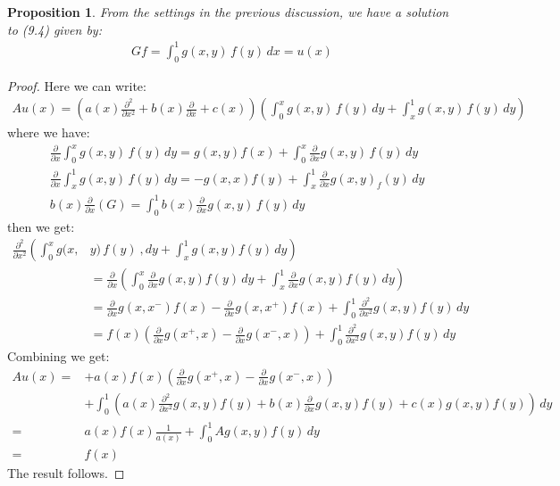 \documentclass[11pt]{book}
\theoremstyle{break}
\theoremstyle{break}
\newtheorem{prop}[lem]{Proposition}
\newcommand{\pd}{\partial}
\begin{document}
\begin{prop}
From the settings in the previous discussion, we have a solution to (9.4) given by:
\begin{align*}
Gf = \int_0^1 g(x,y) \, f(y) \, dx = u(x)
\end{align*}
\end{prop}
\begin{proof}
Here we can write:
\begin{align*}
Au(x) = \left(a(x)\frac{\pd^2}{\pd x^2} + b(x) \frac{\pd}{\pd x} + c(x) \right) \left(\int_0^x g(x,y) \, f(y) \, dy + \int_x^1 g(x,y) \, f(y) \, dy\right)
\end{align*}
where we have:
\begin{align*}
&\frac{\pd}{\pd x} \int_0^x g(x,y) \, f(y) \, dy = g(x,y) f(x) + \int_0^x \frac{\pd}{\pd x}g(x,y) \, f(y) \, dy\\
&\frac{\pd}{\pd x} \int_x^1 g(x,y)\, f(y) \, dy = -g(x,x) f(y) + \int_x^1 \frac{\pd}{\pd x}g(x,y) _f(y) \, dy\\
&b(x) \frac{\pd}{\pd x}(G) = \int_0^1 b(x) \frac{\pd}{\pd x}g(x,y)\, f(y) \, dy
\end{align*}
then we get:
\begin{align*}
\frac{\pd^2 }{\pd x^2}\left(\int_0^x g(x,\right.&\left.y) \, f(y) \ , dy + \int_x^1 g(x,y) f(y) \, dy\right) \\
&= \frac{\pd}{\pd x }\left(\int_0^x \frac{\pd}{\pd x}g(x,y) f(y) \, dy + \int_x^1 \frac{\pd }{\pd x}g(x,y) f(y) \, dy \right)\\
&= \frac{\pd }{\pd x}g(x,x^-) f(x) - \frac{\pd }{\pd x}g(x,x^+) f(x) + \int_0^1 \frac{\pd^2}{\pd x^2}g(x,y) f(y) \, dy \\
&= f(x) \left( \frac{\pd}{\pd x}g(x^+,x) - \frac{\pd}{\pd x}g(x^-,x) \right) + \int_0^1 \frac{\pd^2}{\pd x^2}g(x,y) f(y) \, dy\end{align*}
Combining we get:
\begin{align*}
Au(x) =& +a(x) f(x) \left( \frac{\pd }{\pd x}g(x^+,x) - \frac{\pd }{\pd x}g(x^-,x) \right) \\
&+ \int_0^1 \left( a(x) \frac{\pd^2}{\pd x^2}g(x,y) f(y) + b(x) \frac{\pd }{\pd x}g(x,y) f(y) + c(x) g(x,y) f(y) \right) \, dy\\
=& a(x) f(x) \frac{1}{a(x)} + \int_0^1 Ag(x,y) f(y) \, dy \\
=& f(x)
\end{align*}
The result follows.
\end{proof}
\end{document}

